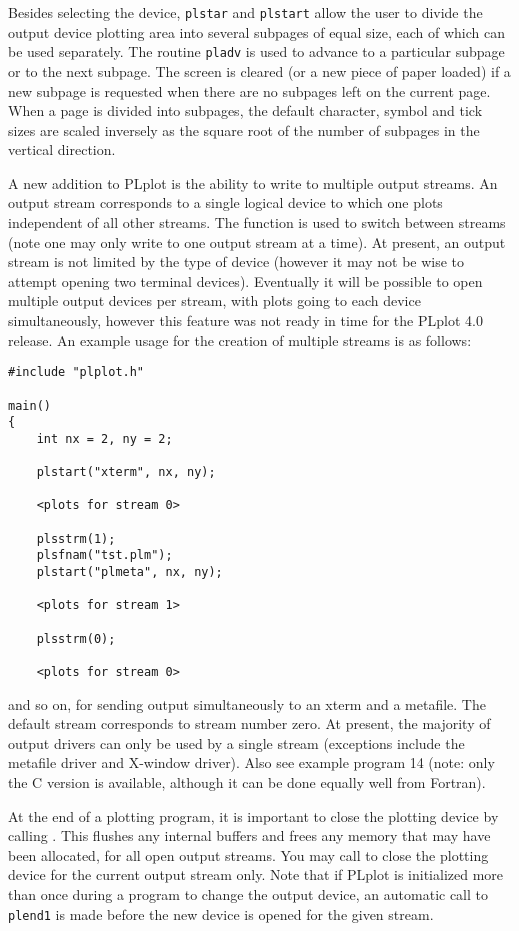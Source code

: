 Besides selecting the device, {\tt plstar} and {\tt plstart} allow the user
to divide the output device plotting area into several subpages of equal
size, each of which can be used separately. The routine {\tt pladv} is used
to advance to a particular subpage or to the next subpage. The screen is
cleared (or a new piece of paper loaded) if a new subpage is requested
when there are no subpages left on the current page.  When a page is
divided into subpages, the default character, symbol and tick sizes are
scaled inversely as the square root of the number of subpages in the
vertical direction. 

A new addition to PLplot is the ability to write to multiple output streams.
An output stream corresponds to a single logical device to which one
plots independent of all other streams.  The function 
is used to switch between streams (note one may only write to one output 
stream at a time).  At present, an output stream is not limited by the
type of device (however it may not be wise to attempt opening two terminal
devices).  Eventually it will be possible to open multiple output devices
per stream, with plots going to each device simultaneously, however this
feature was not ready in time for the PLplot 4.0 release.  An example
usage for the creation of multiple streams is as follows:

\begin{verbatim}
#include "plplot.h"

main()
{
    int nx = 2, ny = 2;

    plstart("xterm", nx, ny);

    <plots for stream 0>

    plsstrm(1);
    plsfnam("tst.plm");
    plstart("plmeta", nx, ny);

    <plots for stream 1>

    plsstrm(0);

    <plots for stream 0>
\end{verbatim}

and so on, for sending output simultaneously to an xterm and a metafile.
The default stream corresponds to stream number zero.  At present, the
majority of output drivers can only be used by a single stream (exceptions
include the metafile driver and X-window driver).  Also see example program
14 (note:  only the C version is available, although it can be done equally
well from Fortran).

At the end of a plotting program, it is important to close the plotting
device by calling . This flushes any internal buffers and frees
any memory that may have been allocated, for all open output streams.  You
may call  to close the plotting device for the current output
stream only.  Note that if PLplot is initialized more than once during a
program to change the output device, an automatic call to {\tt plend1} is
made before the new device is opened for the given stream.

